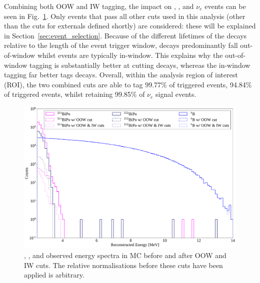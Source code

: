 Combining both OOW and IW  tagging, the impact on , , and \beight{} $\nu_e$ events can be seen in Fig.~\ref{fig:bipo_tagging_efficiency}. Only events that pass all other cuts used in this analysis (other than the cuts for externals defined shortly) are considered: these will be explained in Section~\ref{sec:event_selection}. %
Because of the different lifetimes of the decays relative to the length of the event trigger window,  decays predominantly fall out-of-window whilst  events are typically in-window. This explains why the out-of-window tagging is substantially better at cutting  decays, whereas the in-window tagging far better tags  decays. Overall, within the analysis region of interest (ROI), the two combined cuts are able to tag 99.77\% %
of  triggered events, 94.84\% %
of  triggered events, whilst retaining 99.85\% %
of \beight{} $\nu_e$ signal events.

\begin{figure}[!th]
    \centering
    \includegraphics[width=\textwidth]{6_SolarAnalysis/images/bipo_tagging_eff.pdf}
    \caption[, , and \beight{} observed energy spectra before and after OOW and IW cuts]{, , and \beight{} observed energy spectra in MC before and after OOW and IW cuts. The relative normalisations before these cuts have been applied is arbitrary.}
    \label{fig:bipo_tagging_efficiency}
\end{figure}

